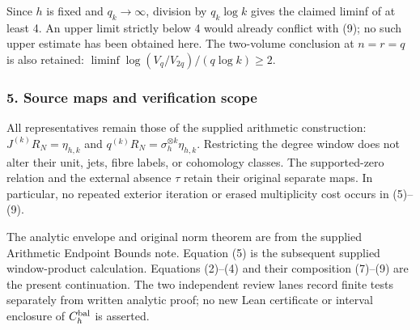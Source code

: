 Since \(h\) is fixed and \(q_k\to\infty\), division by \(q_k\log k\) gives the claimed liminf of at least 4. An upper limit strictly below 4 would already conflict with (9); no such upper estimate has been obtained here. The two-volume conclusion at \(n=r=q\) is also retained: \(\liminf \log(V_q/V_{2q})/(q\log k)\ge2\).

\subsubsection{5. Source maps and verification scope}\label{endpoint-four_volume_threshold--source-maps-and-verification-scope}

All representatives remain those of the supplied arithmetic construction: \(J^{(k)}R_N=\eta_{h,k}\) and \(q^{(k)}R_N=\sigma_h^{\otimes k}\eta_{h,k}\). Restricting the degree window does not alter their unit, jets, fibre labels, or cohomology classes. The supported-zero relation and the external absence \(\tau\) retain their original separate maps. In particular, no repeated exterior iteration or erased multiplicity cost occurs in (5)--(9).

The analytic envelope and original norm theorem are from the supplied Arithmetic Endpoint Bounds note. Equation (5) is the subsequent supplied window-product calculation. Equations (2)--(4) and their composition (7)--(9) are the present continuation. The two independent review lanes record finite tests separately from written analytic proof; no new Lean certificate or interval enclosure of \(C_h^{\rm bal}\) is asserted.
